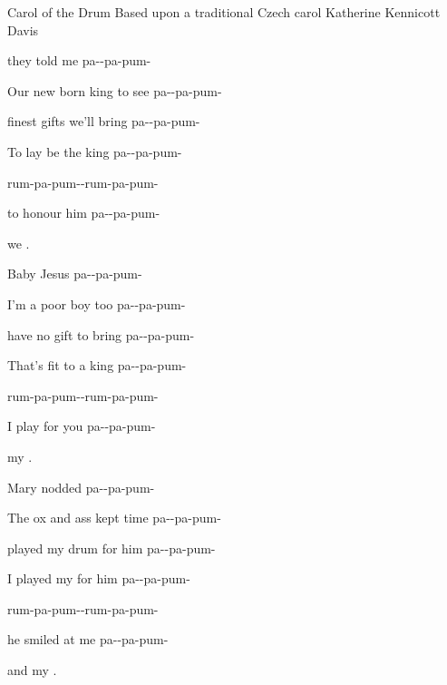 \begin{SBSong}{Carol of the Drum}
  {Based upon a traditional Czech carol}
  {Katherine Kennicott Davis}
  \begin{SBVerse}
	 they told me pa--pa-pum-
	
	Our new born king to see pa--pa-pum-
	
	 finest gifts we'll bring pa--pa-pum-
	
	To lay be the king pa--pa-pum-
	
	rum-pa-pum--rum-pa-pum-
	
	 to honour him pa--pa-pum-
	
	 we .
  \end{SBVerse}
  \begin{SBVerse}
	Baby Jesus pa--pa-pum-
	
	I'm a poor boy too pa--pa-pum-
	
	 have no gift to bring pa--pa-pum-
	
	That's fit to  a king pa--pa-pum-
	
	rum-pa-pum--rum-pa-pum-
	
	 I play for you pa--pa-pum-
	
	 my .
  \end{SBVerse}
  \begin{SBVerse}
	Mary nodded pa--pa-pum-
	
	The ox and ass kept time pa--pa-pum-
	
	 played my drum for him pa--pa-pum-
	
	I played my  for him pa--pa-pum-
	
	rum-pa-pum--rum-pa-pum-
	
	 he smiled at me pa--pa-pum-
	
	 and my .
  \end{SBVerse}
\end{SBSong}


